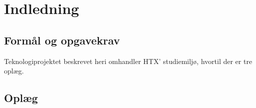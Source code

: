 \section{Indledning}
    \subsection{Formål og opgavekrav}
        Teknologiprojektet beskrevet heri omhandler HTX' studiemiljø, hvortil der er tre oplæg.  
    \subsection{Oplæg}